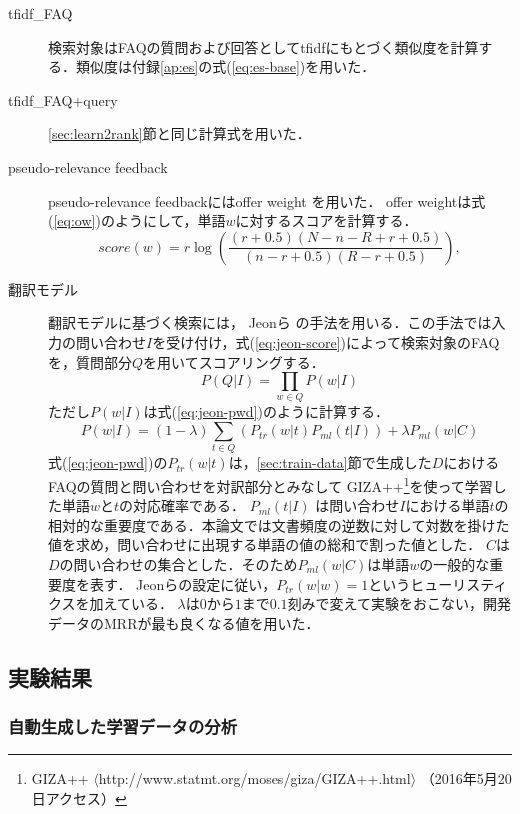 \documentclass[japanese]{jnlp_1.4}
\begin{document}
\begin{description}
  \item[tfidf\_FAQ] 検索対象はFAQの質問および回答としてtfidfにもとづく類似度を計算する．類似度は付録\ref{ap:es}の式(\ref{eq:es-base})を用いた．
  \item[tfidf\_FAQ+query] \ref{sec:learn2rank}節と同じ計算式を用いた．
  \item[pseudo-relevance feedback]
pseudo-relevance feedbackにはoffer weight \cite{robertson:94}を用いた．
offer weightは式(\ref{eq:ow})のようにして，単語$w$に対するスコアを計算する．
\begin{equation}
  score(w) = r \log\left(\frac{(r+0.5)(N-n-R+r+0.5)}{(n-r+0.5)(R-r+0.5)}\right),
	\label{eq:ow}
\end{equation}
  \item[翻訳モデル]
翻訳モデルに基づく検索には，
Jeonら \cite{jeon:05}の手法を用いる．この手法では入力の問い合わせ$I$を受け付け，式(\ref{eq:jeon-score})によって検索対象のFAQを，質問部分$Q$を用いてスコアリングする．
\begin{equation}
	P(Q|I) = \prod_{w \in Q} P(w|I)
	\label{eq:jeon-score}
\end{equation}
ただし$P(w|I)$は式(\ref{eq:jeon-pwd})のように計算する．
\begin{equation}
	P(w|I) = (1-\lambda) \sum_{t \in Q} (P_{tr}(w|t) P_{ml}(t|I)) + \lambda P_{ml}(w|C)
	\label{eq:jeon-pwd}
\end{equation}
式(\ref{eq:jeon-pwd})の$P_{tr}(w|t)$は，\ref{sec:train-data}節で生成した$D$におけるFAQの質問と問い合わせを対訳部分とみなして
GIZA++\footnote{GIZA++ $\langle$http://www.statmt.org/moses/giza/GIZA++.html$\rangle$ （2016年5月20日アクセス）}を使って学習した単語$w$と$t$の対応確率である．
$P_{ml}(t|I)$
は問い合わせ$I$における単語$t$の相対的な重要度である．本論文では文書頻度の逆数に対して対数を掛けた値を求め，問い合わせに出現する単語の値の総和で割った値とした．
$C$は$D$の問い合わせの集合とした．そのため$P_{ml}(w|C)$は単語$w$の一般的な重要度を表す．
Jeonらの設定に従い，$P_{tr}(w|w)=1$というヒューリスティクスを加えている．
$\lambda$は$0$から$1$まで$0.1$刻みで変えて実験をおこない，開発データのMRRが最も良くなる値を用いた．
\end{description}



\subsection{実験結果}

\subsubsection{自動生成した学習データの分析}
\end{document}
